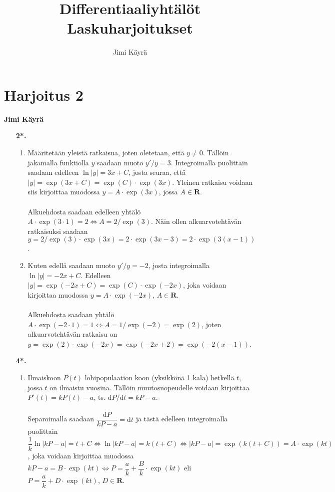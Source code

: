 \documentclass[12pt,fleqn]{article}
\date{}
\title{\textbf{Differentiaaliyhtälöt} \\ Laskuharjoitukset}
\author{Jimi Käyrä}
\begin{document}
\begin{titlepage}
\maketitle
\thispagestyle{empty}
\end{titlepage}

\section*{Harjoitus 2}
\textbf{Jimi Käyrä}\\
\begin{enumerate}[label=\textbf{\arabic*.}]
\item [\textbf{2*.}]
\begin{enumerate}[label=\textbf{\alph*)}]
\item Määritetään yleistä ratkaisua, joten oletetaan, että \(y\neq 0\). Tällöin jakamalla funktiolla \(y\) saadaan muoto \(y'/y=3\). Integroimalla puolittain saadaan edelleen \(\ln |y|=3x+C\), josta seuraa, että \(|y|=\exp (3x+C)=\exp (C)\cdot \exp (3x)\). Yleinen ratkaisu voidaan siis kirjoittaa muodossa \(y=A\cdot \exp(3x)\), jossa \(A\in \mathbf{R}\).\\
 \\
Alkuehdosta saadaan edelleen yhtälö \(A\cdot \exp (3\cdot 1)=2\iff A=2/\exp (3)\). Näin ollen alkuarvotehtävän ratkaisuksi saadaan \(y=2/\exp (3)\cdot \exp (3x)=2\cdot \exp (3x-3)=2\cdot \exp (3(x-1))\).

\item Kuten edellä saadaan muoto \(y'/y=-2\), josta integroimalla \(\ln |y|=-2x+C\). Edelleen \(|y|=\exp (-2x+C)=\exp(C)\cdot \exp(-2x)\), joka voidaan kirjoittaa muodossa \(y=A\cdot \exp(-2x)\), \(A\in \mathbf{R}\).\\
 \\
Alkuehdosta saadaan yhtälö \(A\cdot \exp (-2\cdot 1)=1\iff A=1/\exp (-2)=\exp(2)\), joten alkuarvotehtävän ratkaisu on \(y=\exp(2)\cdot \exp(-2x)=\exp(-2x+2)=\exp(-2(x-1))\).
\end{enumerate}

\item [\textbf{4*.}]
\begin{enumerate}[label=\textbf{\alph*)}]
\item Ilmaiskoon \(P(t)\) lohipopulaation koon (yksikkönä 1 kala) hetkellä \(t\), jossa \(t\) on ilmaistu vuosina. Tällöin muutosnopeudelle voidaan kirjoittaa \(P'(t)=kP(t)-a\), ts. \(\text{d}P/\text{d}t=kP-a\).\\
 \\
Separoimalla saadaan \(\dfrac{\text{d}P}{kP-a}=\text{d}t\) ja tästä edelleen integroimalla puolittain \(\dfrac{1}{k}\ln |kP-a|=t+C\iff \ln |kP-a|=k(t+C) \iff |kP-a| = \exp(k(t+C))=A\cdot \exp(kt)\), joka voidaan kirjoittaa muodossa \(kP-a=B\cdot \exp (kt)\iff P=\dfrac{a}{k}+\dfrac{B}{k}\cdot \exp (kt)\) eli \(P=\dfrac{a}{k}+D\cdot \exp(kt)\), \(D\in \mathbf{R}\).


\end{enumerate}
\end{enumerate}
\end{document}
